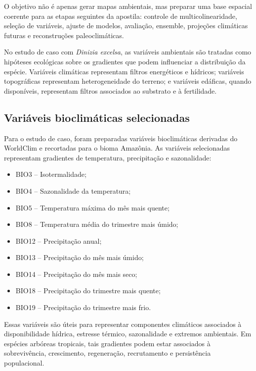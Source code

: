\documentclass{ueap-sdm}
\begin{document}
O objetivo não é apenas gerar mapas ambientais, mas preparar uma base espacial coerente para as etapas seguintes da apostila: controle de multicolinearidade, seleção de variáveis, ajuste de modelos, avaliação, ensemble, projeções climáticas futuras e reconstruções paleoclimáticas.

\begin{aplicacao}
	No estudo de caso com \textit{Dinizia excelsa}, as variáveis ambientais são tratadas como hipóteses ecológicas sobre os gradientes que podem influenciar a distribuição da espécie. Variáveis climáticas representam filtros energéticos e hídricos; variáveis topográficas representam heterogeneidade do terreno; e variáveis edáficas, quando disponíveis, representam filtros associados ao substrato e à fertilidade.
\end{aplicacao}

\subsection{Variáveis bioclimáticas selecionadas}

Para o estudo de caso, foram preparadas variáveis bioclimáticas derivadas do WorldClim e recortadas para o bioma Amazônia. As variáveis selecionadas representam gradientes de temperatura, precipitação e sazonalidade:

\begin{itemize}
	\item BIO3 -- Isotermalidade;
	\item BIO4 -- Sazonalidade da temperatura;
	\item BIO5 -- Temperatura máxima do mês mais quente;
	\item BIO8 -- Temperatura média do trimestre mais úmido;
	\item BIO12 -- Precipitação anual;
	\item BIO13 -- Precipitação do mês mais úmido;
	\item BIO14 -- Precipitação do mês mais seco;
	\item BIO18 -- Precipitação do trimestre mais quente;
	\item BIO19 -- Precipitação do trimestre mais frio.
\end{itemize}

Essas variáveis são úteis para representar componentes climáticos associados à disponibilidade hídrica, estresse térmico, sazonalidade e extremos ambientais. Em espécies arbóreas tropicais, tais gradientes podem estar associados à sobrevivência, crescimento, regeneração, recrutamento e persistência populacional.
\end{document}
